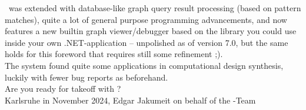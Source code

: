 \GrG\ was extended with database-like graph query result processing (based on pattern matches), quite a lot of general purpose programming advancements, and now features a new builtin graph viewer/debugger based on the \MSAGL{} library\cite{MSAGL} you could use inside your own .NET-application -- unpolished as of version 7.0, but the same holds for this foreword that requires still some refinement ;).\\[2ex]

The system found quite some applications in computational design synthesis, luckily with fewer bug reports as beforehand.\\[2ex]

Are you ready for takeoff with \GrG?\\[2ex]

\noindent Karlsruhe in November 2024, Edgar Jakumeit on behalf of the \GrG-Team
